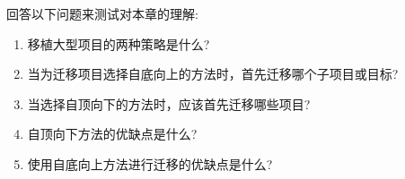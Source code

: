 回答以下问题来测试对本章的理解:

\begin{enumerate}
\item 
移植大型项目的两种策略是什么?

\item 
当为迁移项目选择自底向上的方法时，首先迁移哪个子项目或目标?

\item 
当选择自顶向下的方法时，应该首先迁移哪些项目?

\item 
自顶向下方法的优缺点是什么?

\item 
使用自底向上方法进行迁移的优缺点是什么?
\end{enumerate}